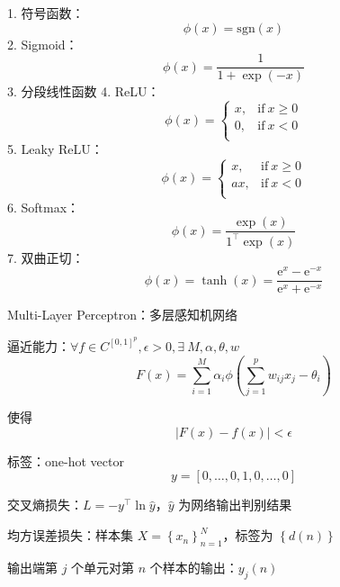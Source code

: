 \documentclass[openany]{ctexbook}
\theoremstyle{kaiti}
\theoremstyle{normal}
\begin{document}
1. 符号函数：
  \begin{equation}
  \phi(x)=\mathrm{sgn}(x)
  \end{equation}
2. Sigmoid：
  \begin{equation}
  \phi(x)=\frac{1}{1+\exp(-x)}
  \end{equation}
3. 分段线性函数
4. ReLU：
  \begin{equation}
  \phi (x)=
  \begin{cases}
    x, &\mathrm{if}~x\geqslant0\\
    0, &\mathrm{if}~x<0\\
  \end{cases}
  \end{equation}
5. Leaky ReLU：
  \begin{equation}
  \phi (x)=
  \begin{cases}
    x, &\mathrm{if}~x\geqslant 0\\
    ax, &\mathrm{if}~x<0\\
  \end{cases}
  \end{equation}
6. Softmax：
  \begin{equation}
  \phi(x)=\frac{\exp(x)}{1^{\top}\exp(x)}
  \end{equation}
7. 双曲正切：
  \begin{equation}
  \phi (x)=\tanh (x)=\frac{\mathrm{e}^x-\mathrm{e}^{-x}}{\mathrm{e}^x+\mathrm{e}^{-x}}
  \end{equation}

Multi-Layer Perceptron：多层感知机网络

逼近能力：$\forall f\in C^{\left[0,1 \right] ^p}, \epsilon >0, \exists~M,\alpha ,\theta ,w$
\begin{equation}
  F(x)=\sum_{i=1}^{M}\alpha_i\phi \left(\sum_{j=1}^{p}w_{ij}x_j-\theta_i \right)
\end{equation}

使得
\begin{equation}
  |F(x)-f(x)|<\epsilon
\end{equation}

标签：one-hot vector
\begin{equation}
  y=\left[0,\dots ,0,1,0,\dots ,0 \right]
\end{equation}

交叉熵损失：$L=-y^{\top}\ln \hat{y}$，$\hat{y}$ 为网络输出判别结果

均方误差损失：样本集 $X=\left\{ x_n \right\}_{n=1}^{N}$，标签为 $\left\{ d\left(n \right)\right\}$

输出端第 $j$ 个单元对第 $n$ 个样本的输出：$y_j\left(n \right)$
\end{document}
